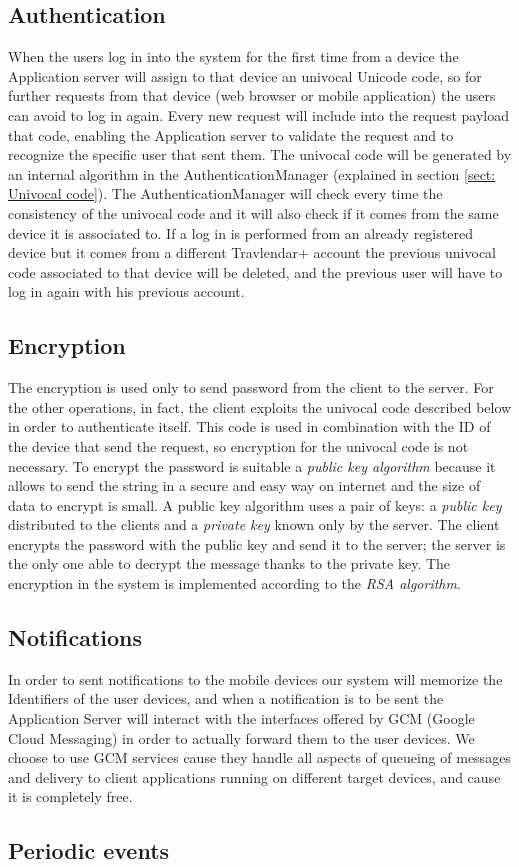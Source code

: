 \subsection{Authentication}
When the users log in into the system for the first time from a device the Application server will assign to that device an univocal Unicode code, so for further requests from that device (web browser or mobile application) the users can avoid to log in again. Every new request will include into the request payload that code, enabling the Application server to validate the request and to recognize the specific user that sent them. The univocal code will be generated by an internal algorithm in the AuthenticationManager (explained in section \ref{sect: Univocal code}). The AuthenticationManager will check every time the consistency of the univocal code and it will also check if it comes from the same device it is associated to.
If a log in is performed from an already registered device but it comes from a different Travlendar+ account the previous univocal code associated to that device will be deleted, and the previous user will have to log in again with his previous account.

\subsection{Encryption}
The encryption is used only to send password from the client to the server. For the other operations, in fact, the client exploits the univocal code described below in order to authenticate itself. This code is used in combination with the ID of the device that send the request, so encryption for the univocal code is not necessary.
To encrypt the password is suitable a \textit{public key algorithm} because it allows to send the string in a secure and easy way on internet and the size of data to encrypt is small.
A public key algorithm uses a pair of keys: a \textit{public key} distributed to the clients and a \textit{private key} known only by the server.
The client encrypts the password with the public key and send it to the server; the server is the only one able to decrypt the message thanks to the private key.
The encryption in the system is implemented according to the \textit{RSA algorithm}.

\subsection{Notifications}
In order to sent notifications to the mobile devices our system will memorize the Identifiers of the user devices, and when a notification is to be sent the Application Server will interact with the interfaces offered by GCM (Google Cloud Messaging) in order to actually forward them to the user devices. We choose to use GCM services cause they handle all aspects of queueing of messages and delivery to client applications running on different target devices, and cause it is completely free.

\subsection{Periodic events}
